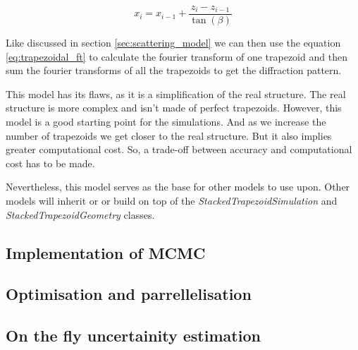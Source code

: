 \medskip

\begin{equation}
    x_{i} = x_{i-1} + \frac{z_{i} - z_{i-1}}{\tan(\beta)}
\end{equation}

\medskip

Like discussed in section \ref{sec:scattering_model} we can then use the equation \ref{eq:trapezoidal_ft} to calculate
the fourier transform of one trapezoid and then sum the fourier transforms of all the 
trapezoids to get the diffraction pattern.

\medskip

This model has its flaws, as it is a simplification of the real structure. The real structure is more complex and
isn't made of perfect trapezoids. However, this model is a good starting point for the simulations. And as we increase the
number of trapezoids we get closer to the real structure. But it also implies greater computational cost.
So, a trade-off between accuracy and computational cost has to be made.

\medskip

Nevertheless, this model serves as the base for other models to use upon. Other models will inherit 
or or build on top of the \textit{StackedTrapezoidSimulation} and \textit{StackedTrapezoidGeometry} classes.




\FloatBarrier



\subsection{Implementation of MCMC}
\subsection{Optimisation and parrellelisation}
\subsection{On the fly uncertainity estimation}